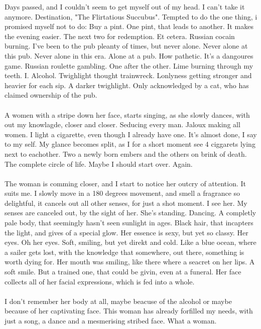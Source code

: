 \documentclass[]{article}
\begin{document}
Days passed, and I couldn't seem to get myself out of my head. I can't take it anymore. Destination, "The Flirtatious Succubus". Tempted to do the one thing, i promised myself not to do: Buy a pint. One pint, that leads to another. It makes the evening easier. The next two for redemption. Et cetera. Russian cocain burning. I've been to the pub pleanty of times, but never alone. Never alone at this pub. Never alone in this era. Alone at a pub. How pathetic. It's a dangoures game. Russian roulette gambling. One after the other. Lime burning through my teeth. I. Alcohol. Twighlight thought trainwreck. Lonlyness getting stronger and heavier for each sip. A darker twighlight. Only acknowledged by a cat, who has claimed ownership of the pub. 
\\ \\
A women with a stripe down her face, starts singing, as she slowly dances, with out my knowlagde, closer and closer. Seducing every man. Jaloux making all women. I light a cigarette, even though I already have one. It's almost done, I say to my self. My glance becomes split, as I for a short moment see 4 ciggarets lying next to eachother. Two a newly born embers and the others on brink of death. The complete circle of life. Maybe I should start over. Again.
\\ \\
The woman is comming closer, and I start to notice her outcry of attention. It suits me. I slowly move in a 180 degrees movement, and smell a fragrance so delightful, it cancels out all other senses, for just a shot moment. I see her. My senses are canceled out, by the sight of her. She's standing. Dancing. A completly pale body, that seemingly hasn't seen sunlight in ages. Black hair, that incapters the light, and gives of a special glow. Her essence is sexy, but yet so classy. Her eyes. Oh her eyes. Soft, smiling, but yet direkt and cold. Like a blue ocean, where a sailer gets lost, with the knowledge that somewhere, out there, something is worth dying for. Her mouth was smiling, like there where a seacret on her lips. A soft smile. But a trained one, that could be givin, even at a funeral. Her face collects all of her facial expressions, which is fed into a whole. 
\\ \\
I don't remember her body at all, maybe beacuse of the alcohol or maybe because of her captivating face. This woman has already forfilled my needs, with just a song, a dance and a mesmerising stribed face. What a woman.
\end{document}
